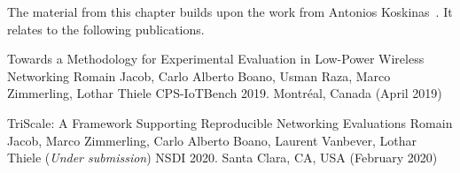 \pagebreak
\begin{publi}

  The material from this chapter builds upon the work from Antonios Koskinas~\cite{koskinas2019reproducibility}. It relates to the following publications.

  \inlineRef%
  {Towards a Methodology for Experimental Evaluation in Low-Power Wireless Networking}%
  {Romain Jacob, Carlo Alberto Boano, Usman Raza, Marco Zimmerling, Lothar Thiele}%
  {CPS-IoTBench 2019. Montréal, Canada (April 2019)}

  \inlineRef%
  {TriScale: A Framework Supporting Reproducible Networking Evaluations}%
  {Romain Jacob, Marco Zimmerling, Carlo Alberto Boano,\newline
  Laurent Vanbever, Lothar Thiele}%
  {(\emph{Under submission}) NSDI 2020. Santa Clara, CA, USA (February 2020)}

\end{publi}
